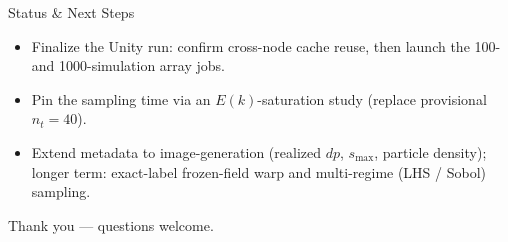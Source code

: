 \documentclass[aspectratio=169]{beamer}
\begin{document}
\begin{frame}{Status \& Next Steps}
  \begin{itemize}
    \item Finalize the Unity run: confirm cross-node cache reuse, then launch the
          100- and 1000-simulation array jobs.
    \item Pin the sampling time via an $E(k)$-saturation study (replace provisional
          $n_t=40$).
    \item Extend metadata to image-generation (realized $dp$, $s_{\max}$, particle
          density); longer term: exact-label frozen-field warp and multi-regime
          (LHS / Sobol) sampling.
  \end{itemize}
  \vfill
  \begin{center}\large Thank you --- questions welcome.\end{center}
\end{frame}
\end{document}
